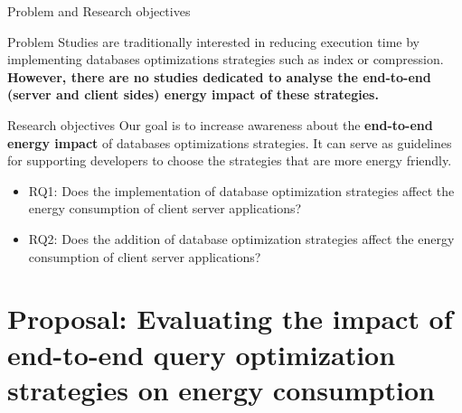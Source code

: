 \documentclass{beamer}
\begin{document}
\begin{frame}{Problem and Research objectives}
    \begin{alertblock}{Problem}
        \small{ 
        Studies are traditionally interested in reducing execution time by implementing databases optimizations strategies such as index or compression. 
        \textbf{However, there are no studies dedicated to analyse the end-to-end (server and client sides) energy impact of these strategies. }}  
    \end{alertblock} 
    
    
    \begin{exampleblock} {Research objectives}
        \small{Our goal is to increase awareness about the \textbf{end-to-end energy impact} of databases optimizations strategies. It can serve as guidelines for supporting developers to choose the strategies that are more energy friendly.
        }
%
         \begin{itemize}
             \scriptsize
             \item RQ1: Does the implementation of database optimization strategies affect the energy consumption of client server applications? 
             \item RQ2: Does the addition of database optimization strategies affect the energy consumption of client server applications?
         \end{itemize}
    \end{exampleblock}
\end{frame}

\section{Proposal: Evaluating the impact of end-to-end query optimization strategies on energy consumption}
\end{document}
